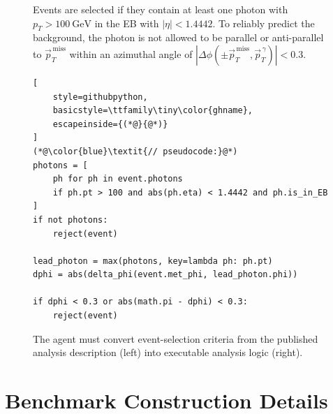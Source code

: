 \documentclass{article}
\begin{document}
\begin{figure}[!h]
    \centering
    \begin{minipage}[t]{0.50\linewidth}
        \begin{tcolorbox}[
            enhanced,
            equal height group=prosecode,
            colback=paperbg,
            colframe=framecol,
            boxrule=0.5pt,
            arc=2mm,
            left=1.2mm,right=1.2mm,top=1mm,bottom=1mm,
            boxsep=1mm
        ]
        \footnotesize
        Events are selected if they contain at least one photon with
        \(p_T > 100~\mathrm{GeV}\) in the EB with \(|\eta| < 1.4442\).
        To reliably predict the background, the photon is not allowed to be
        parallel or anti-parallel to \(\vec{p}_T^{\,\mathrm{miss}}\) within an
        azimuthal angle of
        \(|\Delta\phi(\pm \vec{p}_T^{\,\mathrm{miss}}, \vec{p}_T^{\,\gamma})| < 0.3\).
        \end{tcolorbox}
    \end{minipage}
    \hfill
    \begin{minipage}[t]{0.46\linewidth}
        \begin{tcolorbox}[
            enhanced,
            equal height group=prosecode,
            colback=white,
            colframe=framecol,
            boxrule=0.5pt,
            arc=2mm,
            left=0mm,right=0mm,top=0mm,bottom=0mm,
            boxsep=0.5mm
        ]
\begin{lstlisting}[
    style=githubpython,
    basicstyle=\ttfamily\tiny\color{ghname},
    escapeinside={(*@}{@*)}
]
(*@\color{blue}\textit{// pseudocode:}@*)
photons = [
    ph for ph in event.photons
    if ph.pt > 100 and abs(ph.eta) < 1.4442 and ph.is_in_EB
]
if not photons:
    reject(event)

lead_photon = max(photons, key=lambda ph: ph.pt)
dphi = abs(delta_phi(event.met_phi, lead_photon.phi))

if dphi < 0.3 or abs(math.pi - dphi) < 0.3:
    reject(event)
\end{lstlisting}
        \end{tcolorbox}
    \end{minipage}
    \caption{The agent must convert event-selection criteria from the published analysis description (left) into executable analysis logic (right).}
    \label{fig:prose-to-code}
\end{figure}

\section{Benchmark Construction Details}
\label{app:benchmark-construction}
\end{document}
